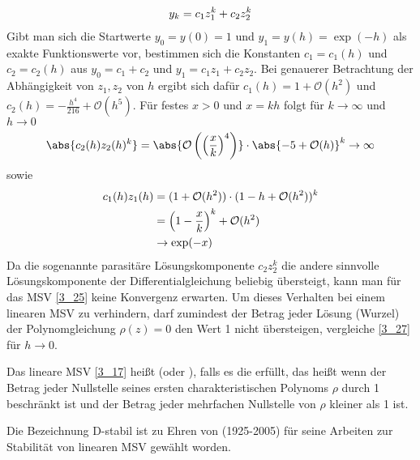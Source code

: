\begin{example}
	\begin{align}
		y_k = c_1z_1 ^k + c_2z_2^k \notag
	\end{align}
	Gibt man sich die Startwerte $y_0=y(0)=1$ und $y_1=y(h)=\exp(-h)$ als exakte Funktionswerte vor, bestimmen sich die Konstanten $c_1=c_1(h)$ und $c_2=c_2(h)$ aus $y_0=c_1+c_2$ und $y_1=c_1z_1 + c_2z_2$. Bei genauerer Betrachtung der Abhängigkeit von $z_1,z_2$ von $h$ ergibt sich dafür $c_1(h)=1+\mathcal{O}(h^2)$ und $c_2(h)=-\frac{h^4}{216} + \mathcal{O}(h^5)$. Für festes $x>0$ und $x=kh$ folgt für $k\to\infty$ und $h\to 0$
	\begin{align}
		\abs{c_2(h) z_2(h)^k} = \abs{\mathcal{O}\left(\left(\frac{x}{k}\right)^4\right)}\cdot\abs{-5+\mathcal{O}(h)}^k\to\infty \notag
	\end{align}
	sowie
	\begin{align}
		c_1(h) z_1(h) &= (1+\mathcal{O}(h^2))\cdot (1-h+\mathcal{O}(h^2))^k \notag \\
		&= \left(1-\frac{x}{k}\right)^k + \mathcal{O}(h^2) \notag \\
		&\to\exp(-x)\notag
	\end{align}
	Da die sogenannte parasitäre Lösungskomponente $c_2z_2^k$ die andere sinnvolle Lösungskomponente der Differentialgleichung beliebig übersteigt, kann man für das MSV \cref{3_25} keine Konvergenz erwarten. Um dieses Verhalten bei einem linearen MSV zu verhindern, darf zumindest der Betrag jeder Lösung (Wurzel) der Polynomgleichung $\rho(z)=0$ den Wert 1 nicht übersteigen, vergleiche \cref{3_27} für $h\to 0$.
\end{example}

\begin{definition}
	Das lineare MSV \cref{3_17} heißt  (oder ), falls es die  erfüllt, das heißt wenn der Betrag jeder Nullstelle seines ersten charakteristischen Polynoms $\rho$ durch 1 beschränkt ist und der Betrag jeder mehrfachen Nullstelle von $\rho$ kleiner als 1 ist.
\end{definition}

Die Bezeichnung D-stabil ist zu Ehren von  (1925-2005) für seine Arbeiten zur Stabilität von linearen MSV gewählt worden.

